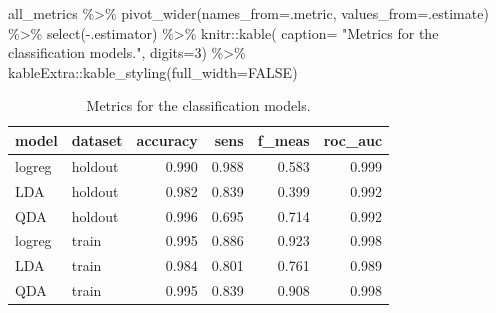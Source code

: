 \documentclass[
]{article}
\newenvironment{Shaded}{\begin{snugshade}}{\end{snugshade}}
\newcommand{\AttributeTok}[1]{\textcolor[rgb]{0.77,0.63,0.00}{#1}}
\newcommand{\ConstantTok}[1]{\textcolor[rgb]{0.00,0.00,0.00}{#1}}
\newcommand{\DecValTok}[1]{\textcolor[rgb]{0.00,0.00,0.81}{#1}}
\newcommand{\FunctionTok}[1]{\textcolor[rgb]{0.00,0.00,0.00}{#1}}
\newcommand{\NormalTok}[1]{#1}
\newcommand{\SpecialCharTok}[1]{\textcolor[rgb]{0.00,0.00,0.00}{#1}}
\newcommand{\StringTok}[1]{\textcolor[rgb]{0.31,0.60,0.02}{#1}}
\begin{document}
\begin{Shaded}
\begin{Highlighting}[]
\NormalTok{all\_metrics }\SpecialCharTok{\%\textgreater{}\%}
        \FunctionTok{pivot\_wider}\NormalTok{(}\AttributeTok{names\_from=}\NormalTok{.metric, }\AttributeTok{values\_from=}\NormalTok{.estimate) }\SpecialCharTok{\%\textgreater{}\%}
        \FunctionTok{select}\NormalTok{(}\SpecialCharTok{{-}}\NormalTok{.estimator) }\SpecialCharTok{\%\textgreater{}\%}
\NormalTok{        knitr}\SpecialCharTok{::}\FunctionTok{kable}\NormalTok{(}
          \AttributeTok{caption=} \StringTok{"Metrics for the classification models."}\NormalTok{, }
          \AttributeTok{digits=}\DecValTok{3}\NormalTok{) }\SpecialCharTok{\%\textgreater{}\%}
\NormalTok{        kableExtra}\SpecialCharTok{::}\FunctionTok{kable\_styling}\NormalTok{(}\AttributeTok{full\_width=}\ConstantTok{FALSE}\NormalTok{)}
\end{Highlighting}
\end{Shaded}

\begin{longtable}[t]{llrrrr}
\caption{\label{tab:metrics table 2}Metrics for the classification models.}\\
\toprule
model & dataset & accuracy & sens & f\_meas & roc\_auc\\
\midrule
logreg & holdout & 0.990 & 0.988 & 0.583 & 0.999\\
LDA & holdout & 0.982 & 0.839 & 0.399 & 0.992\\
QDA & holdout & 0.996 & 0.695 & 0.714 & 0.992\\
logreg & train & 0.995 & 0.886 & 0.923 & 0.998\\
LDA & train & 0.984 & 0.801 & 0.761 & 0.989\\
\addlinespace
QDA & train & 0.995 & 0.839 & 0.908 & 0.998\\
\bottomrule
\end{longtable}
\end{document}
